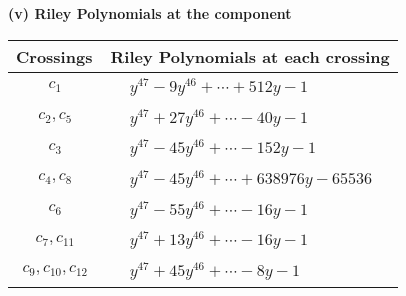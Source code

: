 \documentclass[1p]{elsarticle_modified}
\theoremstyle{definition}
\begin{document}
\flushleft \textbf{(v) Riley Polynomials at the component}\newline \\
\begin{tabular}{m{50pt}|m{274pt}}
Crossings & \hspace{64pt}Riley Polynomials at each crossing \\
\hline $$\begin{aligned}c_{1}\end{aligned}$$&$\begin{aligned}
&y^{47}-9 y^{46}+\cdots+512 y-1
\end{aligned}$\\
\hline $$\begin{aligned}c_{2},c_{5}\end{aligned}$$&$\begin{aligned}
&y^{47}+27 y^{46}+\cdots-40 y-1
\end{aligned}$\\
\hline $$\begin{aligned}c_{3}\end{aligned}$$&$\begin{aligned}
&y^{47}-45 y^{46}+\cdots-152 y-1
\end{aligned}$\\
\hline $$\begin{aligned}c_{4},c_{8}\end{aligned}$$&$\begin{aligned}
&y^{47}-45 y^{46}+\cdots+638976 y-65536
\end{aligned}$\\
\hline $$\begin{aligned}c_{6}\end{aligned}$$&$\begin{aligned}
&y^{47}-55 y^{46}+\cdots-16 y-1
\end{aligned}$\\
\hline $$\begin{aligned}c_{7},c_{11}\end{aligned}$$&$\begin{aligned}
&y^{47}+13 y^{46}+\cdots-16 y-1
\end{aligned}$\\
\hline $$\begin{aligned}c_{9},c_{10},c_{12}\end{aligned}$$&$\begin{aligned}
&y^{47}+45 y^{46}+\cdots-8 y-1
\end{aligned}$\\
\hline
\end{tabular}\\~\\
\end{document}

